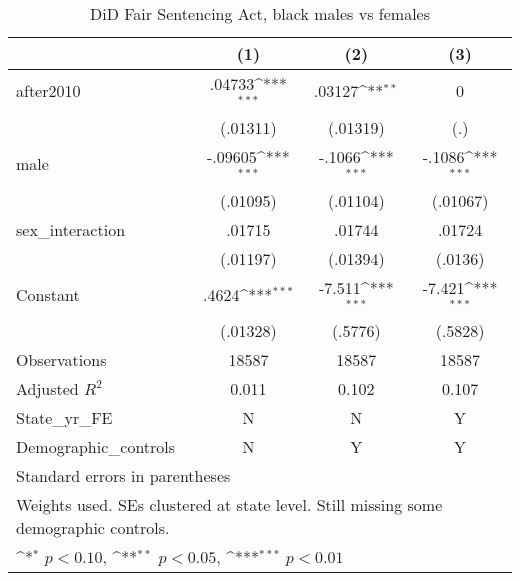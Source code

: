 \begin{table}[htbp]\centering
\def\sym#1{\ifmmode^{#1}\else\(^{#1}\)\fi}
\caption{DiD Fair Sentencing Act, black males vs females}
\begin{tabular}{l*{3}{c}}
\hline\hline
                    &\multicolumn{1}{c}{(1)}         &\multicolumn{1}{c}{(2)}         &\multicolumn{1}{c}{(3)}         \\
\hline
after2010           &      .04733\sym{***}&      .03127\sym{**} &           0         \\
                    &    (.01311)         &    (.01319)         &         (.)         \\
[1em]
male                &     -.09605\sym{***}&      -.1066\sym{***}&      -.1086\sym{***}\\
                    &    (.01095)         &    (.01104)         &    (.01067)         \\
[1em]
sex\_interaction     &      .01715         &      .01744         &      .01724         \\
                    &    (.01197)         &    (.01394)         &     (.0136)         \\
[1em]
Constant            &       .4624\sym{***}&      -7.511\sym{***}&      -7.421\sym{***}\\
                    &    (.01328)         &     (.5776)         &     (.5828)         \\
\hline
Observations        &       18587         &       18587         &       18587         \\
Adjusted \(R^{2}\)  &       0.011         &       0.102         &       0.107         \\
State\_yr\_FE         &           N         &           N         &           Y         \\
Demographic\_controls&           N         &           Y         &           Y         \\
\hline\hline
\multicolumn{4}{l}{\footnotesize Standard errors in parentheses}\\
\multicolumn{4}{l}{\footnotesize Weights used. SEs clustered at state level. Still missing some demographic controls.}\\
\multicolumn{4}{l}{\footnotesize \sym{*} \(p<0.10\), \sym{**} \(p<0.05\), \sym{***} \(p<0.01\)}\\
\end{tabular}
\end{table}

